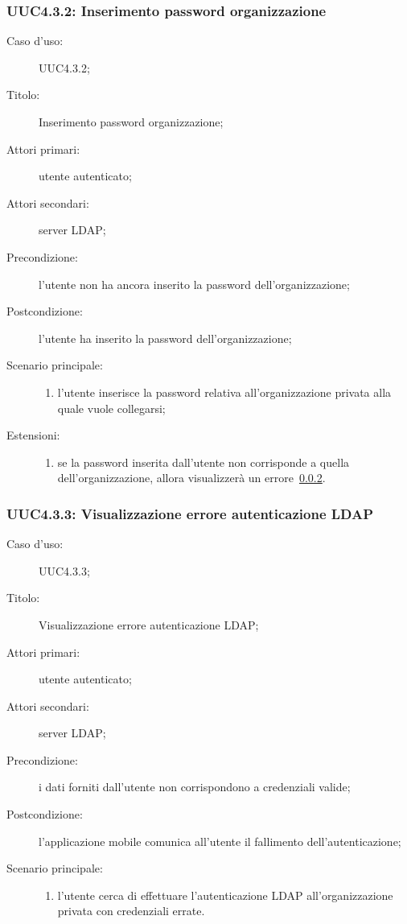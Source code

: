 \documentclass[../../../analisi-dei-requisiti.tex]{subfiles}
\begin{document}
\subsubsection{UUC4.3.2: Inserimento password organizzazione}%
\label{subs:UUC4.3.2}
\begin{description}
  \item[Caso d’uso:] UUC4.3.2;
  \item[Titolo:] Inserimento password organizzazione;
  \item[Attori primari:] utente autenticato;
  \item[Attori secondari:] server LDAP\@;
  \item[Precondizione:] l'utente non ha ancora inserito la password dell'organizzazione;
  \item[Postcondizione:] l'utente ha inserito la password dell'organizzazione;
  \item[Scenario principale:]
        \begin{enumerate}
          \item l'utente inserisce la password relativa all'organizzazione privata alla quale vuole collegarsi;
        \end{enumerate}
  \item[Estensioni:]
        \begin{enumerate}
          \item se la password inserita dall'utente non corrisponde a quella dell'organizzazione, allora visualizzerà un errore~\ref{subs:UUC4.3.3}.
        \end{enumerate}
\end{description}

\subsubsection{UUC4.3.3: Visualizzazione errore autenticazione LDAP}%
\label{subs:UUC4.3.3}
\begin{description}
  \item[Caso d’uso:] UUC4.3.3;
  \item[Titolo:] Visualizzazione errore autenticazione LDAP\@;
  \item[Attori primari:] utente autenticato;
  \item[Attori secondari:] server LDAP\@;
  \item[Precondizione:] i dati forniti dall'utente non corrispondono a credenziali valide;
  \item[Postcondizione:] l'applicazione mobile comunica all'utente il fallimento dell'autenticazione;
  \item[Scenario principale:]
        \begin{enumerate}
          \item l'utente cerca di effettuare l'autenticazione LDAP all'organizzazione privata con credenziali errate.
        \end{enumerate}
\end{description}
\end{document}
